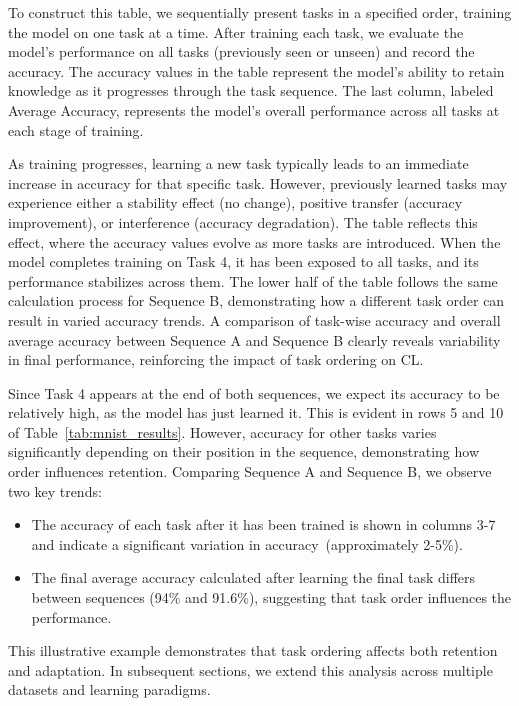 To construct this table, we sequentially present tasks in a specified order, training the model on one task at a time. After training each task, we evaluate the model's performance on all tasks (previously seen or unseen) and record the accuracy. The accuracy values in the table represent the model's ability to retain knowledge as it progresses through the task sequence. The last column, labeled Average Accuracy, represents the model's overall performance across all tasks at each stage of training.

As training progresses, learning a new task typically leads to an immediate increase in accuracy for that specific task. However, previously learned tasks may experience either a stability effect (no change), positive transfer (accuracy improvement), or interference (accuracy degradation). The table reflects this effect, where the accuracy values evolve as more tasks are introduced. When the model completes training on Task 4, it has been exposed to all tasks, and its performance stabilizes across them. The lower half of the table follows the same calculation process for Sequence B, demonstrating how a different task order can result in varied accuracy trends. A comparison of task-wise accuracy and overall average accuracy between Sequence A and Sequence B clearly reveals variability in final performance, reinforcing the impact of task ordering on CL.

Since Task 4 appears at the end of both sequences, we expect its accuracy to be relatively high, as the model has just learned it. This is evident in rows 5 and 10 of Table~\ref{tab:mnist_results}. However, accuracy for other tasks varies significantly depending on their position in the sequence, demonstrating how order influences retention. Comparing Sequence A and Sequence B, we observe two key trends:

\begin{itemize}
    \item The accuracy of each task after it has been trained is shown in columns 3-7 and indicate a significant variation in accuracy~(approximately 2-5\%).
    \item The final average accuracy calculated after learning the final task differs between sequences (94\% and 91.6\%), suggesting that task order influences the performance.
\end{itemize}

This illustrative example demonstrates that task ordering affects both retention and adaptation. In subsequent sections, we extend this analysis across multiple datasets and learning paradigms.

